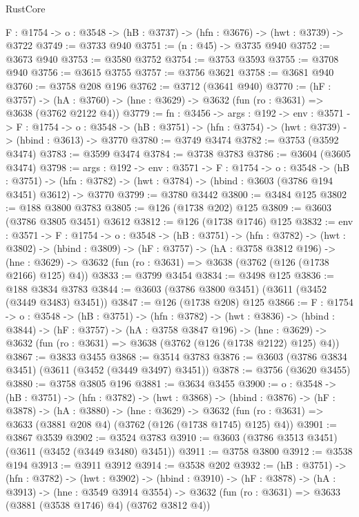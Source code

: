 \begin{lexlean}{RustCore}
\begin{coremodule}
  {F : @1754} -> {o : @3548} -> (hB : @3737) -> (hfn : @3676) -> (hwt : @3739) -> @3722
@3749 := @3733 @940
@3751 := (n : @45) -> @3735 @940
@3752 := @3673 @940
@3753 := @3580 @3752
@3754 := @3753 @3593
@3755 := @3708 @940
@3756 := @3615 @3755
@3757 := @3756 @3621
@3758 := @3681 @940
@3760 := @3758 @208 @196
@3762 := @3712 (@3641 @940)
@3770 := (hF : @3757) ->
  (hA : @3760) -> (hne : @3629) -> @3632 (fun (ro : @3631) => @3638 (@3762 @2122 @4))
@3779 := {fn : @3456} ->
  {args : @192} ->
  {env : @3571} ->
  {F : @1754} ->
  {o : @3548} -> (hB : @3751) -> (hfn : @3754) -> (hwt : @3739) -> (hbind : @3613) -> @3770
@3780 := @3749 @3474
@3782 := @3753 (@3592 @3474)
@3783 := @3599 @3474
@3784 := @3738 @3783
@3786 := @3604 (@3605 @3474)
@3798 := {args : @192} ->
  {env : @3571} ->
  {F : @1754} ->
  {o : @3548} ->
  (hB : @3751) ->
  (hfn : @3782) -> (hwt : @3784) -> (hbind : @3603 (@3786 @194 @3451) @3612) -> @3770
@3799 := @3780 @3442
@3800 := @3484 @125
@3802 := @188 @3800 @3783
@3805 := @126 (@1738 @202) @125
@3809 := @3603 (@3786 @3805 @3451) @3612
@3812 := @126 (@1738 @1746) @125
@3832 := {env : @3571} ->
  {F : @1754} ->
  {o : @3548} ->
  (hB : @3751) ->
  (hfn : @3782) ->
  (hwt : @3802) ->
  (hbind : @3809) ->
  (hF : @3757) ->
  (hA : @3758 @3812 @196) ->
  (hne : @3629) -> @3632 (fun (ro : @3631) => @3638 (@3762 (@126 (@1738 @2166) @125) @4))
@3833 := @3799 @3454
@3834 := @3498 @125
@3836 := @188 @3834 @3783
@3844 := @3603 (@3786 @3800 @3451) (@3611 (@3452 (@3449 @3483) @3451))
@3847 := @126 (@1738 @208) @125
@3866 := {F : @1754} ->
  {o : @3548} ->
  (hB : @3751) ->
  (hfn : @3782) ->
  (hwt : @3836) ->
  (hbind : @3844) ->
  (hF : @3757) ->
  (hA : @3758 @3847 @196) ->
  (hne : @3629) -> @3632 (fun (ro : @3631) => @3638 (@3762 (@126 (@1738 @2122) @125) @4))
@3867 := @3833 @3455
@3868 := @3514 @3783
@3876 := @3603 (@3786 @3834 @3451) (@3611 (@3452 (@3449 @3497) @3451))
@3878 := @3756 (@3620 @3455)
@3880 := @3758 @3805 @196
@3881 := @3634 @3455
@3900 := {o : @3548} ->
  (hB : @3751) ->
  (hfn : @3782) ->
  (hwt : @3868) ->
  (hbind : @3876) ->
  (hF : @3878) ->
  (hA : @3880) ->
  (hne : @3629) ->
  @3632 (fun (ro : @3631) => @3633 (@3881 @208 @4) (@3762 (@126 (@1738 @1745) @125) @4))
@3901 := @3867 @3539
@3902 := @3524 @3783
@3910 := @3603 (@3786 @3513 @3451) (@3611 (@3452 (@3449 @3480) @3451))
@3911 := @3758 @3800
@3912 := @3538 @194
@3913 := @3911 @3912
@3914 := @3538 @202
@3932 := (hB : @3751) ->
  (hfn : @3782) ->
  (hwt : @3902) ->
  (hbind : @3910) ->
  (hF : @3878) ->
  (hA : @3913) ->
  (hne : @3549 @3914 @3554) ->
  @3632 (fun (ro : @3631) => @3633 (@3881 (@3538 @1746) @4) (@3762 @3812 @4))

\end{coremodule}
\end{lexlean}
